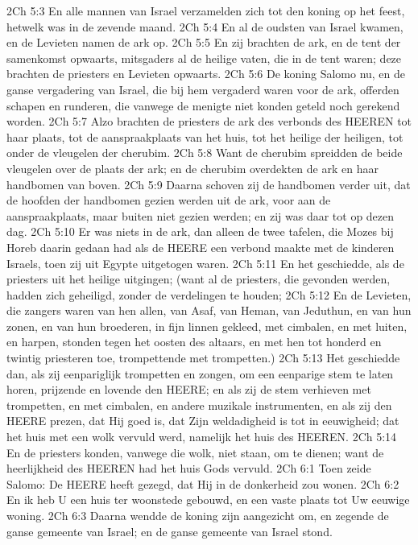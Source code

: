 2Ch 5:3  En alle mannen van Israel verzamelden zich tot den koning op het feest, hetwelk was in de zevende maand.
2Ch 5:4  En al de oudsten van Israel kwamen, en de Levieten namen de ark op.
2Ch 5:5  En zij brachten de ark, en de tent der samenkomst opwaarts, mitsgaders al de heilige vaten, die in de tent waren; deze brachten de priesters en Levieten opwaarts.
2Ch 5:6  De koning Salomo nu, en de ganse vergadering van Israel, die bij hem vergaderd waren voor de ark, offerden schapen en runderen, die vanwege de menigte niet konden geteld noch gerekend worden.
2Ch 5:7  Alzo brachten de priesters de ark des verbonds des HEEREN tot haar plaats, tot de aanspraakplaats van het huis, tot het heilige der heiligen, tot onder de vleugelen der cherubim.
2Ch 5:8  Want de cherubim spreidden de beide vleugelen over de plaats der ark; en de cherubim overdekten de ark en haar handbomen van boven.
2Ch 5:9  Daarna schoven zij de handbomen verder uit, dat de hoofden der handbomen gezien werden uit de ark, voor aan de aanspraakplaats, maar buiten niet gezien werden; en zij was daar tot op dezen dag.
2Ch 5:10  Er was niets in de ark, dan alleen de twee tafelen, die Mozes bij Horeb daarin gedaan had als de HEERE een verbond maakte met de kinderen Israels, toen zij uit Egypte uitgetogen waren.
2Ch 5:11  En het geschiedde, als de priesters uit het heilige uitgingen; (want al de priesters, die gevonden werden, hadden zich geheiligd, zonder de verdelingen te houden;
2Ch 5:12  En de Levieten, die zangers waren van hen allen, van Asaf, van Heman, van Jeduthun, en van hun zonen, en van hun broederen, in fijn linnen gekleed, met cimbalen, en met luiten, en harpen, stonden tegen het oosten des altaars, en met hen tot honderd en twintig priesteren toe, trompettende met trompetten.)
2Ch 5:13  Het geschiedde dan, als zij eenpariglijk trompetten en zongen, om een eenparige stem te laten horen, prijzende en lovende den HEERE; en als zij de stem verhieven met trompetten, en met cimbalen, en andere muzikale instrumenten, en als zij den HEERE prezen, dat Hij goed is, dat Zijn weldadigheid is tot in eeuwigheid; dat het huis met een wolk vervuld werd, namelijk het huis des HEEREN.
2Ch 5:14  En de priesters konden, vanwege die wolk, niet staan, om te dienen; want de heerlijkheid des HEEREN had het huis Gods vervuld.
2Ch 6:1  Toen zeide Salomo: De HEERE heeft gezegd, dat Hij in de donkerheid zou wonen.
2Ch 6:2  En ik heb U een huis ter woonstede gebouwd, en een vaste plaats tot Uw eeuwige woning.
2Ch 6:3  Daarna wendde de koning zijn aangezicht om, en zegende de ganse gemeente van Israel; en de ganse gemeente van Israel stond.

